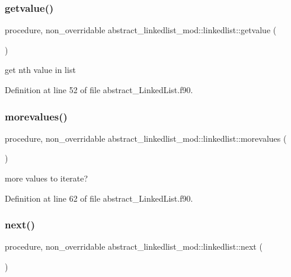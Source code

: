 \subsubsection{\texorpdfstring{getvalue()}{getvalue()}}
{\footnotesize\ttfamily procedure, non\+\_\+overridable abstract\+\_\+linkedlist\+\_\+mod\+::linkedlist\+::getvalue (\begin{DoxyParamCaption}{ }\end{DoxyParamCaption})\hspace{0.3cm}{\ttfamily [private]}}



get nth value in list 



Definition at line 52 of file abstract\+\_\+\+Linked\+List.\+f90.

\mbox{\label{structabstract__linkedlist__mod_1_1linkedlist_adac9f898125d07bacdee51f7beed0ec1}} 
\subsubsection{\texorpdfstring{morevalues()}{morevalues()}}
{\footnotesize\ttfamily procedure, non\+\_\+overridable abstract\+\_\+linkedlist\+\_\+mod\+::linkedlist\+::morevalues (\begin{DoxyParamCaption}{ }\end{DoxyParamCaption})\hspace{0.3cm}{\ttfamily [private]}}



more values to iterate? 



Definition at line 62 of file abstract\+\_\+\+Linked\+List.\+f90.

\mbox{\label{structabstract__linkedlist__mod_1_1linkedlist_ae301aa96709e62ff823e9fd7c52ff517}} 
\subsubsection{\texorpdfstring{next()}{next()}}
{\footnotesize\ttfamily procedure, non\+\_\+overridable abstract\+\_\+linkedlist\+\_\+mod\+::linkedlist\+::next (\begin{DoxyParamCaption}{ }\end{DoxyParamCaption})\hspace{0.3cm}{\ttfamily [private]}}




